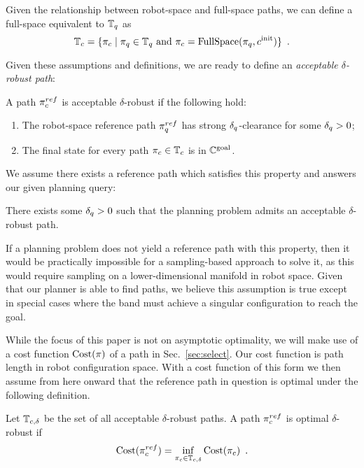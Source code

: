 Given the relationship between robot-space and full-space paths, we can define a full-space equivalent to $\mathbb{T}_q$ as
\begin{equation}
    \mathbb{T}_c = \{ \pi_{c} \mid \pi_{q} \in \mathbb{T}_q \textrm{ and } \pi_{c} = \textrm{FullSpace}(\pi_{q}, c^\textrm{init}) \} \enspace .
\end{equation}

Given these assumptions and definitions, we are ready to define an \textit{acceptable $\delta$-robust path}:
\begin{definition}
\label{def:robust}
A path $\pi_{c}^{ref}$ is acceptable $\delta$-robust if the following hold:
\begin{enumerate}
    \item The robot-space reference path $\pi_{q}^{ref}$ has strong $\delta_q$-clearance for some $\delta_q > 0$;
    \item The final state for every path $\pi_{c} \in \mathbb{T}_c$ is in $\mathbb{C}^\textrm{goal}$. 
\end{enumerate}
\end{definition}
\noindent We assume there exists a reference path which satisfies this property and answers our given planning query:

\begin{assumption}
    There exists some $\delta_q > 0$ such that the planning problem admits an acceptable $\delta$-robust path.
    \label{ass:solvable_problem}
\end{assumption}

If a planning problem does not yield a reference path with this property, then it would be practically impossible for a sampling-based approach to solve it, as this would require sampling on a lower-dimensional manifold in robot space. Given that our planner is able to find paths, we believe this assumption is true except in special cases where the band must achieve a singular configuration to reach the goal.


While the focus of this paper is not on asymptotic optimality, we will make use of a cost function $\textrm{Cost}(\pi)$ of a path in Sec.~\ref{sec:select}. Our cost function is path length in robot configuration space. With a cost function of this form we then assume from here onward that the reference path in question is optimal under the following definition.

\begin{definition}
    Let $\mathbb{T}_{c,\delta}$ be the set of all acceptable $\delta$-robust paths. A path $\pi_{c}^{ref}$ is optimal $\delta$-robust if
    \begin{equation}
        \textrm{Cost}(\pi_{c}^{ref}) = \inf_{\pi_{c} \in \mathbb{T}_{c,\delta}} \textrm{Cost}(\pi_{c}) \enspace .
    \end{equation}
\end{definition}

